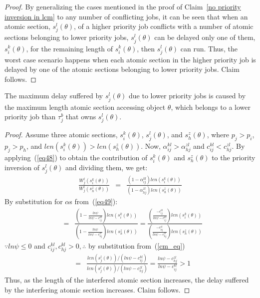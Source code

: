 \begin{proof}
By generalizing the cases mentioned in the proof of Claim~\ref{no priority inversion in lcm} to any number of conflicting jobs, it can be seen that when an atomic section, $s_j^l(\theta)$, of a higher priority job conflicts with a number of atomic sections belonging to lower priority jobs, $s_j^l(\theta)$ can be delayed only one of them, $s_i^k(\theta)$, for the remaining length of $s_i^k(\theta)$, then $s_j^l(\theta)$ can run. Thus, the worst case scenario happens when each atomic section in the higher priority job is delayed by one of the atomic sections belonging to lower priority jobs. Claim follows.
\end{proof}


\begin{clm}
\label{max_pri_inv}
The maximum delay suffered by $s_j^l(\theta)$ due to lower priority jobs is caused by the maximum length atomic section accessing object $\theta$, which belongs to a lower priority job than $\tau_j^b$ that owns $s_j^l(\theta)$.
\end{clm}

\begin{proof}
Assume three atomic sections, $s_i^k(\theta)$, $s_j^l(\theta)$, and $s_h^z(\theta)$, where $p_j>p_i$, $p_j>p_h$, and $len(s_i^k(\theta))>len(s_h^z(\theta))$. Now, $\alpha_{ij}^{kl}>\alpha_{hj}^{zl}$ and $c_{ij}^{kl}<c_{hj}^{zl}$. By applying~(\ref{eq48}) to obtain the contribution of $s_i^k(\theta)$ and $s_h^z(\theta)$ to the priority inversion of $s_j^l(\theta)$ and dividing them, we get:
\begin{eqnarray*}
\frac{W_{j}^{l}(s_{i}^{k}(\theta))}{W_{j}^{l}(s_{h}^{z}(\theta))} & = & \frac{\left(1-\alpha_{ij}^{kl}\right)len(s_{i}^{k}(\theta))}{\left(1-\alpha_{hj}^{zl}\right)len(s_{h}^{z}(\theta))}
\end{eqnarray*}
By substitution for $\alpha$s from~(\ref{eq49}):
\begin{eqnarray*}
 & = & \frac{(1-\frac{ln\psi}{ln\psi-c_{ij}^{kl}})len(s_{i}^{k}(\theta))}{(1-\frac{ln\psi}{ln\psi-c_{hj}^{zl}})len(s_{h}^{z}(\theta))}
  =  \frac{(\frac{-c_{ij}^{kl}}{ln\psi-c_{ij}^{kl}})len(s_{i}^{k}(\theta))}{(\frac{-c_{hj}^{zl}}{ln\psi-c_{hj}^{zl}})len(s_{h}^{z}(\theta))}\end{eqnarray*}
$\because ln\psi \le 0$ and $c_{ij}^{kl},c_{hj}^{kl} > 0, \therefore$ by substitution from~(\ref{cm_eq})
\begin{eqnarray*}
 & = & \frac{len(s_{j}^{l}(\theta))/(ln\psi-c_{ij}^{kl})}{len(s_{j}^{l}(\theta))/(ln\psi-c_{hj}^{zl})}
  =  \frac{ln\psi-c_{hj}^{zl}}{ln\psi-c_{ij}^{kl}}>1\end{eqnarray*}
Thus, as the length of the interfered atomic section increases, the delay suffered by the interfering atomic section increases. Claim follows.
\end{proof}


